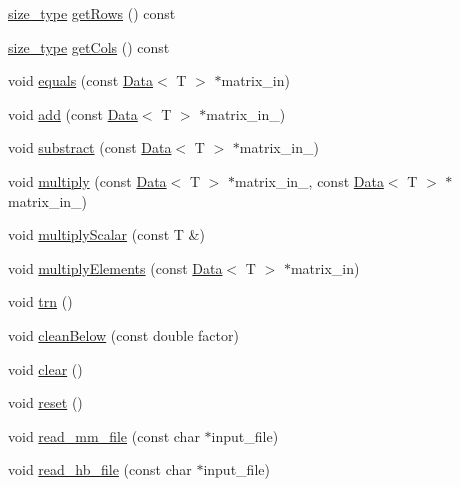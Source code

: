 \begin{DoxyCompactItemize}
\item 
\hyperlink{lmx__mat__data_8h_a49b489a408a211a90e766329c0732d7b}{size\-\_\-type} \hyperlink{classlmx_1_1Type__csc_a7d04d6b93337ead44534da43fb5d2b40}{get\-Rows} () const 
\item 
\hyperlink{lmx__mat__data_8h_a49b489a408a211a90e766329c0732d7b}{size\-\_\-type} \hyperlink{classlmx_1_1Type__csc_adc1754239031a024f0126008cca8257c}{get\-Cols} () const 
\item 
void \hyperlink{classlmx_1_1Type__csc_a149e8f0b1846fcc5e7731d75f0ab8401}{equals} (const \hyperlink{classlmx_1_1Data}{Data}$<$ T $>$ $\ast$matrix\-\_\-in)
\item 
void \hyperlink{classlmx_1_1Type__csc_ab81fb9afcee4f795aaed31383d484612}{add} (const \hyperlink{classlmx_1_1Data}{Data}$<$ T $>$ $\ast$matrix\-\_\-in\-\_)
\item 
void \hyperlink{classlmx_1_1Type__csc_a933efcd2ae77ca2460a0e27dff8d8798}{substract} (const \hyperlink{classlmx_1_1Data}{Data}$<$ T $>$ $\ast$matrix\-\_\-in\-\_)
\item 
void \hyperlink{classlmx_1_1Type__csc_a5f2764badb799b42b956cb6bd384b55f}{multiply} (const \hyperlink{classlmx_1_1Data}{Data}$<$ T $>$ $\ast$matrix\-\_\-in\-\_, const \hyperlink{classlmx_1_1Data}{Data}$<$ T $>$ $\ast$matrix\-\_\-in\-\_)
\item 
void \hyperlink{classlmx_1_1Type__csc_ad963bfd1f5e2cb5d524a15cac334afc4}{multiply\-Scalar} (const T \&)
\item 
void \hyperlink{classlmx_1_1Type__csc_ac6270f91b6bffab66a8bf4f5bcd26ab9}{multiply\-Elements} (const \hyperlink{classlmx_1_1Data}{Data}$<$ T $>$ $\ast$matrix\-\_\-in)
\item 
void \hyperlink{classlmx_1_1Type__csc_a77e01d8d8334bd448028d75c33e72f7f}{trn} ()
\item 
void \hyperlink{classlmx_1_1Type__csc_a7a5cbf46b6fe051d10586b6f6b5cf244}{clean\-Below} (const double factor)
\item 
void \hyperlink{classlmx_1_1Type__csc_a2c85d71b10223e2da91e947739cd5e67}{clear} ()
\item 
void \hyperlink{classlmx_1_1Type__csc_a9a5a413641307bc2229b79b46f9b43a8}{reset} ()
\item 
void \hyperlink{classlmx_1_1Type__csc_adf2926b0afd5a318fdc730225d10d2aa}{read\-\_\-mm\-\_\-file} (const char $\ast$input\-\_\-file)
\item 
void \hyperlink{classlmx_1_1Type__csc_a167170de05513c15944e09722a29d699}{read\-\_\-hb\-\_\-file} (const char $\ast$input\-\_\-file)

\end{DoxyCompactItemize}
